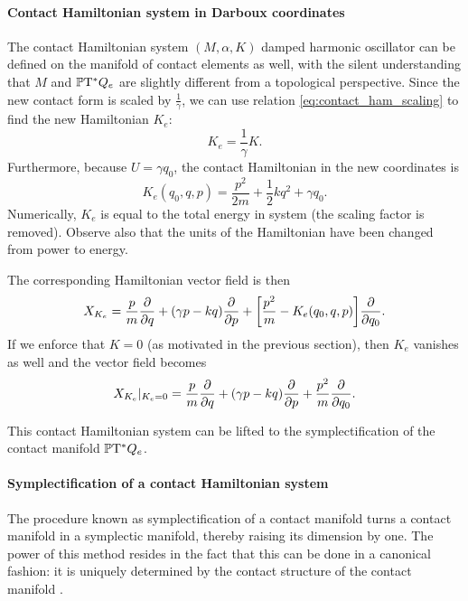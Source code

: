 \paragraph{Contact Hamiltonian system in Darboux coordinates} The contact Hamiltonian system \((M, \alpha, K)\) damped harmonic oscillator can be defined on the manifold of contact elements as well, with the silent understanding that \(M\) and \(\mathbb{P}\mathrm{T}^* Q_e\) are slightly different from a topological perspective. Since the new contact form is scaled by \(\tfrac{1}{\gamma}\), we can use relation \cref{eq:contact_ham_scaling} to find the new Hamiltonian \(K_e\):
\begin{equation}
     K_e = \frac{1}{\gamma} K.
\end{equation}
Furthermore, because \(U = \gamma q_0\), the contact Hamiltonian in the new coordinates is
\begin{equation}
    K_e(q_0, q, p) = \frac{p^2}{2m} + \frac{1}{2}kq^2 + \gamma q_0.
    \label{eq:dho_contact_hamiltonian_e}
\end{equation}
Numerically, \(K_e\) is equal to the total energy in system (the scaling factor is removed). Observe also that the units of the Hamiltonian have been changed from power to energy.

The corresponding Hamiltonian vector field is then
\begin{equation}
    X_{K_e} = \frac{p}{m}\pdv{}{q} + (\gamma p - kq) \pdv{}{p} + \qty[\frac{p^2}{m} - K_e(q_0, q, p)]\pdv{}{q_0}. 
    \label{eq:ham_vf_e}
\end{equation}
If we enforce that \(K = 0\) (as motivated in the previous section), then \(K_e\) vanishes as well and the vector field becomes 
\begin{equation}
    X_{K_e}\vert_{K_e = 0} = \frac{p}{m}\pdv{}{q} + (\gamma p - kq) \pdv{}{p} + \frac{p^2}{m}\pdv{}{q_0}.
    \label{eq:ham_vf_e_liouville}
\end{equation}

This contact Hamiltonian system can be lifted to the symplectification of the contact manifold \(\mathbb{P}\mathrm{T}^* Q_e\).

\paragraph{Symplectification of a contact Hamiltonian system} The procedure known as symplectification of a contact manifold turns a contact manifold in a symplectic manifold, thereby raising its dimension by one. The power of this method resides in the fact that this can be done in a canonical fashion: it is uniquely determined by the contact structure of the contact manifold \cite{Arnold1989}.

